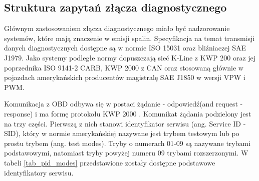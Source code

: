 \documentclass[12pt, twoside]{article} %
\numberwithin{equation}{subsection}
\numberwithin{figure}{section}
\numberwithin{table}{section}
\begin{document}
		\newpage
		
		\subsection{Struktura zapytań złącza diagnostycznego}
		
		\hspace{0.5cm}Głównym zastosowaniem złącza diagnostycznego miało być nadzorowanie systemów, które mają znaczenie w emisji spalin. Specyfikacja na temat transmisji danych diagnostycznych dostępne są w normie ISO 15031 oraz bliźniaczej SAE J1979. Jako systemy podległe normy dopuszczają sieć K-Line z KWP 200 oraz jej poprzednika ISO 9141-2 CARB, KWP 2000 z CAN oraz stosowaną głównie w pojazdach amerykańskich producentów magistralę SAE J1850 w wersji VPW i PWM.
		
		Komunikacja z OBD odbywa się w postaci żądanie - odpowiedź(and request - response) i ma formę protokołu KWP 2000 \cite{Schmidgall08}. Komunikat żądania podzielony jest na trzy części. Pierwszą z nich stanowi identyfikator serwisu (ang. Service ID - SID), który w normie amerykańskiej nazywane jest trybem testowym lub po prostu trybem (ang. test modes). Tryby o numerach 01-09 są nazywane trybami podstawowymi, natomiast tryby powyżej numeru 09 trybami rozszerzonymi\cite{Merkisz02}. W tabeli \ref{tab_pid_modes} przedstawione zostały dostępne podstawowe identyfikatory serwisu.
		
\end{document}
